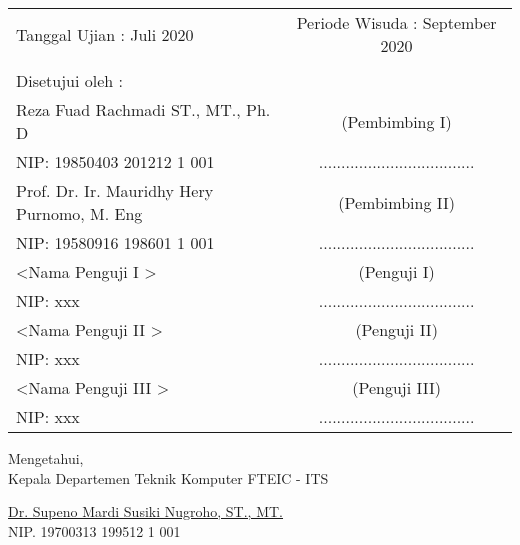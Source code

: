 \noindent
\begin{tabularx}{\textwidth}{X c}
  Tanggal Ujian : Juli 2020                   & Periode Wisuda : September 2020     \\
                                              &                                     \\
  Disetujui oleh :                            &                                     \\
  Reza Fuad Rachmadi ST., MT., Ph. D          & (Pembimbing I)                      \\
  NIP: 19850403 201212 1 001                  & ................................... \\
  Prof. Dr. Ir. Mauridhy Hery Purnomo, M. Eng & (Pembimbing II)                     \\
  NIP: 19580916 198601 1 001
                                              & ................................... \\
  \textless Nama Penguji I \textgreater       & (Penguji I)                         \\
  NIP: xxx                                    & ................................... \\
  \textless Nama Penguji II \textgreater      & (Penguji II)                        \\
  NIP: xxx                                    & ................................... \\
  \textless Nama Penguji III \textgreater     & (Penguji III)                       \\
  NIP: xxx                                    & ................................... \\
\end{tabularx}
\endgroup

\vspace{2ex}

\begin{center}
  Mengetahui, \\
  Kepala Departemen Teknik Komputer FTEIC - ITS \\

  \vspace{6ex}

  \underline{Dr. Supeno Mardi Susiki Nugroho, ST., MT.} \\
  NIP. 19700313 199512 1 001
\end{center}
\endgroup

